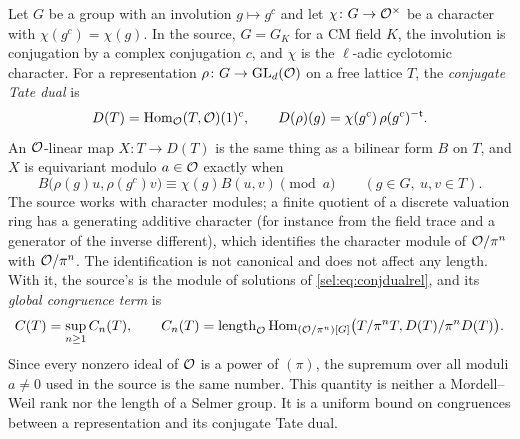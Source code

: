 Let $G$ be a group with an involution $g\mapsto g^c$ and let
$\chi\colon G\to\mathcal{O}^\times$ be a character with $\chi(g^c)=\chi(g)$. In the
source, $G=G_K$ for a CM field $K$, the involution is conjugation by a
complex conjugation $c$, and $\chi$ is the $\ell$-adic cyclotomic
character. For a representation $\rho\colon G\to\operatorname{GL}_d(\mathcal{O})$ on a free
lattice $T$, the \emph{conjugate Tate dual} is
\begin{equation}\label{sel:eq:conjdual}
 D(T)=\operatorname{Hom}_{\mathcal{O}}(T,\mathcal{O})(1)^c,\qquad
 D(\rho)(g)=\chi(g^c)\,\rho(g^c)^{-\mathsf{t}}.
\end{equation}
An $\mathcal{O}$-linear map $X\colon T\to D(T)$ is the same thing as a bilinear form
$B$ on $T$, and $X$ is equivariant modulo $a\in\mathcal{O}$ exactly when
\begin{equation}\label{sel:eq:conjdualrel}
 B\bigl(\rho(g)u,\rho(g^c)v\bigr)\equiv\chi(g)B(u,v)\pmod a
 \qquad(g\in G,\ u,v\in T).
\end{equation}
The source works with character modules; a finite quotient of a discrete
valuation ring has a generating additive character (for instance from the
field trace and a generator of the inverse different), which identifies the
character module of $\mathcal{O}/\pi^n$ with $\mathcal{O}/\pi^n$. The identification is not
canonical and does not affect any length. With it, the source's
 is the module of solutions of
\eqref{sel:eq:conjdualrel}, and its \emph{global congruence term}
 is
\begin{equation}\label{sel:eq:congterm}
 C(T)=\sup_{n\ge1}C_n(T),\qquad
 C_n(T)=\operatorname{length}_{\mathcal{O}}\operatorname{Hom}_{(\mathcal{O}/\pi^n)[G]}\bigl(T/\pi^nT,D(T)/\pi^nD(T)\bigr).
\end{equation}
Since every nonzero ideal of $\mathcal{O}$ is a power of $(\pi)$, the supremum over
all moduli $a\ne0$ used in the source is the same number. This quantity is
neither a Mordell--Weil rank nor the length of a Selmer group. It is a
uniform bound on congruences between a representation and its conjugate Tate
dual.

